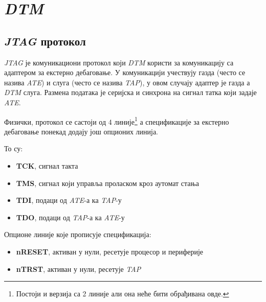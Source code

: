 \chapter{\textit{\acrfull{DTM}}}

\section{\textit{\acrshort{JTAG}} протокол}

\textit{\acrshort{JTAG}} је комуникациони протокол који \textit{\acrshort{DTM}} користи за комуникацију са адаптером за екстерно дебаговање.
У комуникацији учествују газда (често се назива \textit{\acrfull{ATE}}) и слуга (често се назива \textit{\acrfull{TAP}}), у овом случају адаптер је газда а \textit{\acrshort{DTM}} слуга.
Размена података је серијска и синхрона на сигнал татка који задаје \textit{\acrshort{ATE}}.

Физички, протокол се састоји од 4 линије\footnote{Постоји и верзија са 2 линије али она неће бити обрађивана овде.} а спецификације за екстерно дебаговање понекад додају још опционих линија.

То су:
\begin{itemize}
	\item \textbf{\acrfull{TCK}}, сигнал такта
	\item \textbf{\acrfull{TMS}}, сигнал који управља проласком кроз аутомат стања
	\item \textbf{\acrfull{TDI}}, подаци од \textit{\acrshort{ATE}}-а ка \textit{\acrshort{TAP}}-у
	\item \textbf{\acrfull{TDO}}, подаци од \textit{\acrshort{TAP}}-а ка \textit{\acrshort{ATE}}-у
\end{itemize}
Опционе линије које прописује спецификација:
\begin{itemize}
	\item \textbf{nRESET}, активан у нули, ресетује процесор и периферије
	\item \textbf{n\acrshort{TRST}}, активан у нули, ресетује \textit{\acrshort{TAP}}
\end{itemize}

